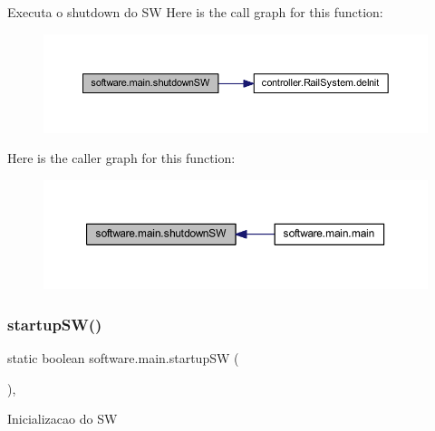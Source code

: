 Executa o shutdown do SW Here is the call graph for this function\+:\nopagebreak
\begin{figure}[H]
\begin{center}
\leavevmode
\includegraphics[width=350pt]{classsoftware_1_1main_a7ae92a61ad38d1c4bd6ba6be3ff49fa0_cgraph}
\end{center}
\end{figure}
Here is the caller graph for this function\+:\nopagebreak
\begin{figure}[H]
\begin{center}
\leavevmode
\includegraphics[width=350pt]{classsoftware_1_1main_a7ae92a61ad38d1c4bd6ba6be3ff49fa0_icgraph}
\end{center}
\end{figure}
\mbox{\label{classsoftware_1_1main_a704a81c9cf3d3fff3d223f49b9b98b67}} 
\subsubsection{\texorpdfstring{startup\+S\+W()}{startupSW()}}
{\footnotesize\ttfamily static boolean software.\+main.\+startup\+SW (\begin{DoxyParamCaption}{ }\end{DoxyParamCaption})\hspace{0.3cm}{\ttfamily [static]}, {\ttfamily [package]}}

Inicializacao do SW


